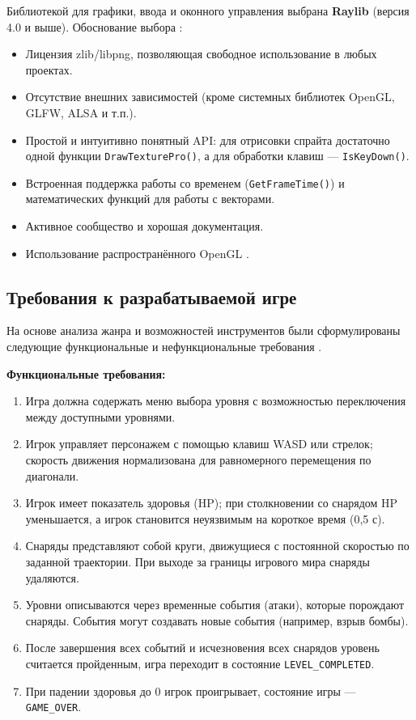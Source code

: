 \documentclass[../main.tex]{subfiles}
\begin{document}
Библиотекой для графики, ввода и оконного управления выбрана \textbf{Raylib} (версия 4.0 и выше). Обоснование выбора \cite{rees2025}:
\begin{itemize}
	\item Лицензия zlib/libpng, позволяющая свободное использование в любых проектах.
	\item Отсутствие внешних зависимостей (кроме системных библиотек OpenGL, GLFW, ALSA и т.п.).
	\item Простой и интуитивно понятный API: для отрисовки спрайта достаточно одной функции \texttt{DrawTexturePro()}, а для обработки клавиш — \texttt{IsKeyDown()}.
	\item Встроенная поддержка работы со временем (\texttt{GetFrameTime()}) и математических функций для работы с векторами.
	\item Активное сообщество и хорошая документация.
	\item Использование распространённого OpenGL \cite{kessenich2025_opengl}.
\end{itemize}

\subsection{Требования к разрабатываемой игре}

На основе анализа жанра и возможностей инструментов были сформулированы следующие функциональные и нефункциональные требования \cite{nystrom2014}.

\textbf{Функциональные требования:}
\begin{enumerate}
	\item Игра должна содержать меню выбора уровня с возможностью переключения между доступными уровнями.
	\item Игрок управляет персонажем с помощью клавиш WASD или стрелок; скорость движения нормализована для равномерного перемещения по диагонали.
	\item Игрок имеет показатель здоровья (HP); при столкновении со снарядом HP уменьшается, а игрок становится неуязвимым на короткое время (0,5 с).
	\item Снаряды представляют собой круги, движущиеся с постоянной скоростью по заданной траектории. При выходе за границы игрового мира снаряды удаляются.
	\item Уровни описываются через временные события (атаки), которые порождают снаряды. События могут создавать новые события (например, взрыв бомбы).
	\item После завершения всех событий и исчезновения всех снарядов уровень считается пройденным, игра переходит в состояние \texttt{LEVEL\_COMPLETED}.
	\item При падении здоровья до 0 игрок проигрывает, состояние игры — \texttt{GAME\_OVER}.
\end{enumerate}
\end{document}
